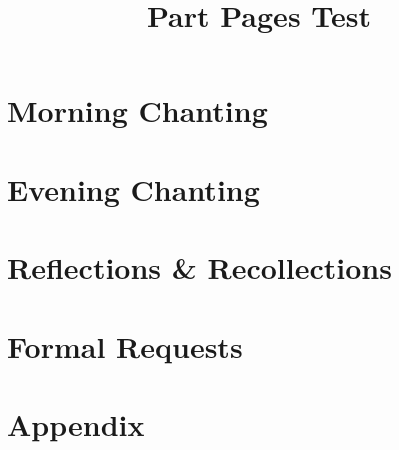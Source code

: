 \documentclass[ babelLanguage=english, final, ]{chantingbook}
\title{Part Pages Test}
\begin{document}
\mainmatter

\part{Morning Chanting}

\part{Evening Chanting}

\part{Reflections \& Recollections}

\part{Formal Requests}

\part{Appendix}
\end{document}
